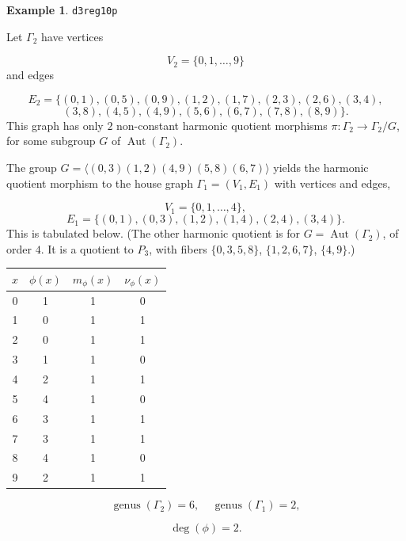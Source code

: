 \documentclass[12pt,letterpaper]{article}
\theoremstyle{definition}
\newtheorem{example}[theorem]{Example}
\DeclareMathOperator{\Aut}{Aut}
\DeclareMathOperator{\genus}{genus}
\begin{document}
\begin{example}%
\label{example:d3reg10p}
  {\tt d3reg10p}\newline
{\rm  
Let $\Gamma_2$ have vertices

\[
V_2=\{0,1,\dots,9\}
\]
and edges

\[
E_2 = \{
(0, 1), (0, 5), (0, 9), (1, 2), (1, 7), (2, 3), (2, 6), (3, 4), 
\]
\[
 (3, 8), (4, 5), (4, 9), (5, 6), (6, 7), (7, 8), (8, 9)
\}.
\]
This graph has only $2$ non-constant harmonic quotient
morphisms $\pi: \Gamma_2\to \Gamma_2/G$, for some subgroup
$G$ of $\Aut(\Gamma_2)$.


The group $G = \langle (0,3)(1,2)(4,9)(5,8)(6,7) \rangle$ yields the
harmonic quotient morphism to the house graph
$\Gamma_1 = (V_1,E_1)$
with vertices and edges,

\[
V_1=\{0,1,\dots, 4\},
\]
\[
E_1=\{
(0, 1), (0, 3), (1, 2), (1, 4), (2, 4), (3, 4)
\}.
\]
This is tabulated below. (The other harmonic quotient is for
$G=\Aut(\Gamma_2)$, of order $4$. It is a quotient to $P_3$, with fibers
$\{0,3,5,8\}$, $\{1,2,6,7\}$, $\{4,9\}$.)

\begin{center}
\begin{tabular}{c|c|c|c}  
  $x$ & $\phi(x)$ & $m_\phi(x)$ & $\nu_\phi(x)$ \\ \hline
  0   &    1   &        1         &  0   \\ 
  1   &    0   &        1         &  1   \\ 
  2   &    0   &        1         &  1   \\ 
  3   &    1   &        1         &  0   \\ 
  4   &    2   &        1         &  1   \\ 
  5   &    4   &        1         &  0    \\ 
  6   &    3   &        1         &  1   \\ 
  7   &    3   &        1         &  1   \\
  8   &    4   &        1         &  0   \\
  9   &    2   &        1         &  1   \\ 
\end{tabular}
\end{center}

\[
  \genus(\Gamma_2) =6,\ \ \ \ \
  \genus(\Gamma_1) =2,
\]

\[
\deg(\phi) =2.
\]

}
\end{example}
\end{document}
